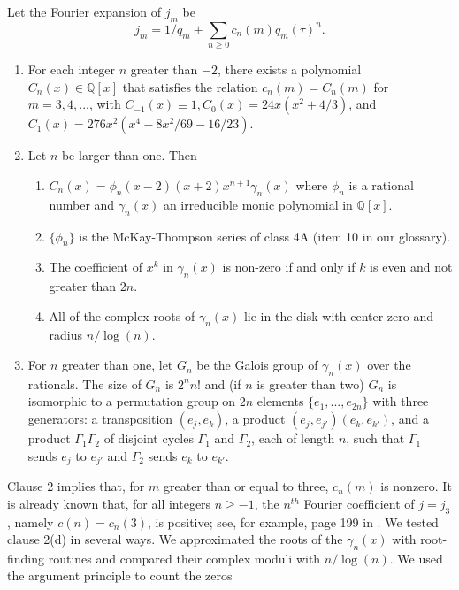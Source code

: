 \documentclass{article}
\begin{document}
\begin{conjecture}
Let the Fourier expansion of 
$j_m$ be
$$j_m = 1/q_m +
\sum_{n\geq 0} c_n(m) q_m(\tau)^n.$$
\begin{enumerate}
\item For each integer $n$
greater than $-2$,
there exists a polynomial
$C_n(x) \in \mathbb{Q}[x]$
that satisfies the relation
$c_n(m) = C_n(m)$ for $m = 3, 4, ...$, with
$C_{-1}(x) \equiv 1,
C_0(x) = 24x(x^2 + 4/3)$,
and $C_1(x) = 276x^2(x^4-8x^2/69 - 16/23)$.
\item Let $n$ be larger than one. Then
\begin{enumerate}
\item $C_n(x) = 
\phi_n (x-2)(x+2)x^{n+1}\gamma_n(x)$
where $\phi_n$ is a rational number and 
$\gamma_n(x)$ an irreducible 
monic polynomial in $\mathbb{Q}[x]$.
\item $\{\phi_n\}$
is  the McKay-Thompson series of class 4A 
(item 10 in our glossary).
\item The coefficient of $x^k$ in $\gamma_n(x)$
is non-zero if and only if $k$ is even and
not greater than $2n$.
\item All of the complex roots of 
$\gamma_n(x)$ lie in the disk
with center zero and radius $n/\log (n)$.
\end{enumerate}
\item For $n$ greater than one, let 
$G_n$ be the Galois group
of $\gamma_n(x)$ over the rationals. The
size of $G_n$ is $2^n n!$
and (if $n$ is greater than two) 
$G_n$ is isomorphic
to a permutation group on $2n$ elements
$\{e_1, ..., e_{2n}\}$
with three generators: a transposition
$(e_j, e_k)$, a product $(e_j,e_{j'})(e_k, e_{k'})$,
and  a product $\Gamma_1 \Gamma_2$
of disjoint cycles
$\Gamma_1$ and $\Gamma_2$, each of length $n$,
such that $\Gamma_1$ sends $e_j$ to $e_{j'}$
and $\Gamma_2$ sends $e_k$ to $e_{k'}$.
\end{enumerate}
\end{conjecture} \noindent
Clause 2 implies that, for 
$m$ greater than  or equal to three,
$c_n(m)$ is nonzero.
\noindent
It is already known that,
for all integers $n \geq -1$,
the $n^{th}$ Fourier coefficient of
$j = j_3$, namely
$c(n) = c_n(3)$,
is positive;
see, for example,
page 199 in \cite{rankinModular}.
\newline \newline \noindent
We tested clause 2(d) in several ways.
We approximated the roots of
the $\gamma_n(x)$  with root-finding routines
and compared their
complex moduli with $n/\log (n)$.
We used the argument principle to count the zeros 
\end{document}
